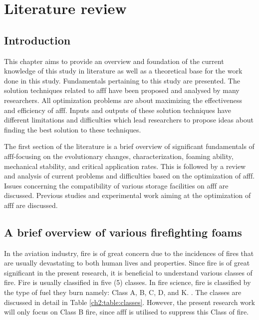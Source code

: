 \chapter{Literature review}
\section{Introduction}
This chapter aims to provide an overview and foundation of the current knowledge of this study in literature as well as a theoretical base for the work done in this study. Fundamentals pertaining to this study are presented. The solution techniques related to \acrshort{afff} have been proposed and analysed by many researchers. All optimization problems are about maximizing the effectiveness and efficiency of \acrshort{afff}. Inputs and outputs of these solution techniques have different limitations and difficulties which lead researchers to propose ideas about finding the best solution to these techniques.

The first section of the literature is a brief overview of significant fundamentals of \acrshort{afff}-focusing on the evolutionary changes, characterization, foaming ability, mechanical stability, and critical application rates. This is followed by a review and analysis of current problems and difficulties based on the optimization of \acrshort{afff}. Issues concerning the compatibility of various storage facilities on \acrshort{afff} are discussed. Previous studies and experimental work aiming at the optimization of \acrshort{afff} are discussed.

\section{A brief overview of various firefighting foams}
In the aviation industry, fire is of great concern due to the incidences of fires that are usually devastating to both human lives and properties. Since fire is of great significant in the present research, it is beneficial to understand various classes of fire. Fire is usually classified in five (5) classes. In fire science, fire is classified by the type of fuel they burn namely: Class A, B, C, D, and K. \cite{oguike2013study}.  The classes are discussed in detail in Table \ref{ch2:table:classes}. However, the present research work will only focus on Class B fire, since \acrshort{afff} is utilised to suppress this Class of fire.

